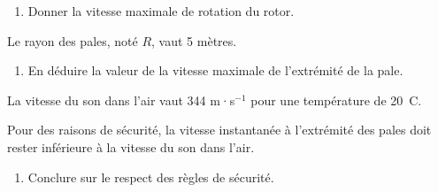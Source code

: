 \begin{enumerate}[resume]
	\item Donner la vitesse maximale de rotation du rotor.
\end{enumerate}

Le rayon des pales, noté $R$, vaut 5 mètres.
\begin{enumerate}[resume]
	\item En déduire la valeur de la vitesse maximale de l'extrémité de la pale.
\end{enumerate}

La vitesse du son dans l'air vaut 344 m·s$^{-1}$ pour une température de 20~\degres C.

Pour des raisons de sécurité, la vitesse instantanée à l'extrémité des pales doit rester inférieure à la vitesse du son dans l'air.
\begin{enumerate}[resume]
	\item Conclure sur le respect des règles de sécurité.
\end{enumerate}

\bigskip

